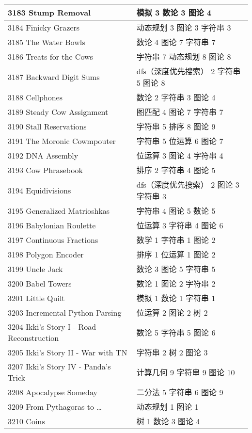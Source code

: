 \begin{longtable}{| p{} | p{} |}
 3183 Stump Removal  & 模拟 3 数论 3 图论 4 \\ \hline
 3184 Finicky Grazers  & 动态规划 3 图论 3 字符串 3 \\ \hline
 3185 The Water Bowls  & 数论 4 图论 7 字符串 7 \\ \hline
 3186 Treats for the Cows  & 字符串 7 动态规划 8 图论 8 \\ \hline
 3187 Backward Digit Sums  & dfs（深度优先搜索） 2 字符串 5 图论 8 \\ \hline
 3188 Cellphones  & 数论 2 字符串 3 图论 4 \\ \hline
 3189 Steady Cow Assignment  & 图匹配 4 图论 7 字符串 7 \\ \hline
 3190 Stall Reservations  & 字符串 5 排序 8 图论 9 \\ \hline
 3191 The Moronic Cowmpouter  & 字符串 5 位运算 6 图论 7 \\ \hline
 3192 DNA Assembly  & 位运算 3 图论 4 字符串 4 \\ \hline
 3193 Cow Phrasebook  & 排序 2 字符串 4 图论 5 \\ \hline
 3194 Equidivisions  & dfs（深度优先搜索） 2 图论 3 字符串 3 \\ \hline
 3195 Generalized Matrioshkas  & 字符串 4 图论 5 数论 5 \\ \hline
 3196 Babylonian Roulette  & 位运算 3 字符串 4 图论 6 \\ \hline
 3197 Continuous Fractions  & 数学 1 字符串 1 图论 2 \\ \hline
 3198 Polygon Encoder  & 排序 1 位运算 1 图论 2 \\ \hline
 3199 Uncle Jack  & 数论 3 图论 5 字符串 5 \\ \hline
 3200 Babel Towers  & 数论 1 图论 2 字符串 2 \\ \hline
 3201 Little Quilt  & 模拟 1 数论 1 字符串 1 \\ \hline
 3203 Incremental Python Parsing  & 位运算 2 图论 2 树 2 \\ \hline
 3204 Ikki's Story I - Road Reconstruction  & 数论 5 字符串 5 图论 6 \\ \hline
 3205 Ikki's Story II - War with TN  & 字符串 2 树 2 图论 3 \\ \hline
 3207 Ikki's Story IV - Panda's Trick  & 计算几何 9 字符串 9 图论 10 \\ \hline
 3208 Apocalypse Someday  & 二分法 5 字符串 6 图论 9 \\ \hline
 3209 From Pythagoras to …  & 动态规划 1 图论 1 \\ \hline
 3210 Coins  & 树 1 数论 3 图论 4 \\ \hline

\end{longtable}
